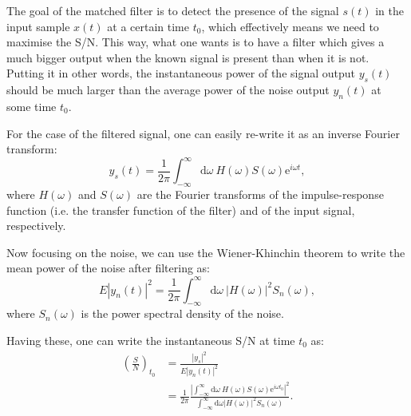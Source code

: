 The goal of the matched filter is to detect the presence of the signal $s(t)$ in the input sample $x(t)$ at a certain time $t_{0}$, which effectively means we need to maximise the S/N. This way, what one wants is to have a filter which gives a much bigger output when the known signal is present than when it is not. Putting it in other words, the instantaneous power of the signal output $y_{s}(t)$ should be much larger than the average power of the noise output $y_{n}(t)$ at some time $t_{0}$.

For the case of the filtered signal, one can easily re-write it as an inverse Fourier transform:
\begin{equation}\label{2.4.3}
	y_{s}(t) = \frac{1}{2\pi} \int_{-\infty}^{\infty} \mathrm{d}\omega \ H(\omega) S(\omega) \mathrm{e}^{i \omega t},
\end{equation}
where $H(\omega)$ and $S(\omega)$ are the Fourier transforms of the impulse-response function (i.e. the transfer function of the filter) and of the input signal, respectively.

Now focusing on the noise, we can use the Wiener-Khinchin theorem \cite{Goodman1985} to write the mean power of the noise after filtering as:
\begin{equation}\label{2.4.4}
	E|y_{n}(t)|^{2} = \frac{1}{2\pi} \int_{-\infty}^{\infty} \mathrm{d}\omega \ |H(\omega)|^{2} S_{n}(\omega),
\end{equation}
where $S_{n}(\omega)$ is the power spectral density of the noise.

Having these, one can write the instantaneous S/N at time $t_{0}$ as:
\begin{equation}\label{2.4.5}
	\begin{split}
		\left(\frac{S}{N}\right)_{t_{0}} &= \frac{|y_{s}|^{2}}{E|y_{n}(t)|^{2}}\\
		&= \frac{1}{2\pi} \frac{\left|\int_{-\infty}^{\infty} \mathrm{d}\omega \ H(\omega) S(\omega) \mathrm{e}^{i \omega t_{0}}\right|^{2}}{\int_{-\infty}^{\infty} \mathrm{d}\omega \left|H(\omega)\right|^{2} S_{n}(\omega)}.
	\end{split}
\end{equation}

